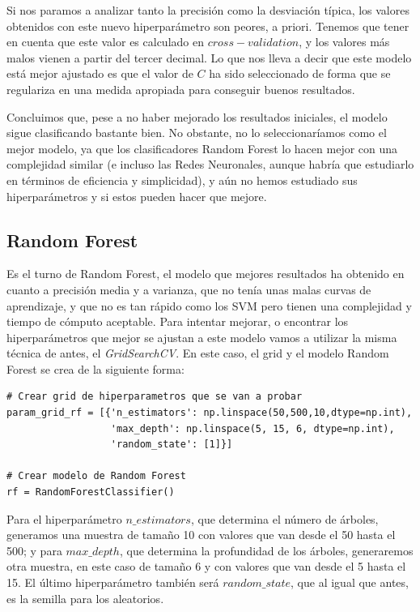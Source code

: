 \documentclass[11pt,a4paper]{article}
\begin{document}
Si nos paramos a analizar tanto la precisión como la desviación típica, los valores obtenidos con este nuevo hiperparámetro son peores, a
priori. Tenemos que tener en cuenta que este valor es calculado en $cross-validation$, y los valores más malos vienen a partir del tercer
decimal. Lo que nos lleva a decir que este modelo está mejor ajustado es que el valor de $C$ ha sido seleccionado de forma que se
regulariza en una medida apropiada para conseguir buenos resultados.

Concluimos que, pese a no haber mejorado los resultados iniciales, el modelo sigue clasificando bastante bien. No obstante, no lo
seleccionaríamos como el mejor modelo, ya que los clasificadores Random Forest lo hacen mejor con una complejidad similar (e incluso las
Redes Neuronales, aunque habría que estudiarlo en términos de eficiencia y simplicidad), y aún no hemos estudiado sus hiperparámetros y si
estos pueden hacer que mejore.

\subsection{Random Forest}

Es el turno de Random Forest, el modelo que mejores resultados ha obtenido en cuanto a precisión media y a varianza, que no tenía unas
malas curvas de aprendizaje, y que no es tan rápido como los SVM pero tienen una complejidad y tiempo de cómputo aceptable. Para intentar
mejorar, o encontrar los hiperparámetros que mejor se ajustan a este modelo vamos a utilizar la misma técnica de antes, el
\textit{GridSearchCV}. En este caso, el grid y el modelo Random Forest se crea de la siguiente forma:

\begin{lstlisting}
# Crear grid de hiperparametros que se van a probar
param_grid_rf = [{'n_estimators': np.linspace(50,500,10,dtype=np.int),
                  'max_depth': np.linspace(5, 15, 6, dtype=np.int),
                  'random_state': [1]}]

# Crear modelo de Random Forest
rf = RandomForestClassifier()

\end{lstlisting}

Para el hiperparámetro $n\_estimators$, que determina el número de árboles, generamos una muestra de tamaño 10 con valores que van desde el
50 hasta el 500; y para $max\_depth$, que determina la profundidad de los árboles, generaremos otra muestra, en este caso de tamaño 6 y con
valores que van desde el 5 hasta el 15. El último hiperparámetro también será $random\_state$, que al igual que antes, es la semilla para
los aleatorios.
\end{document}
